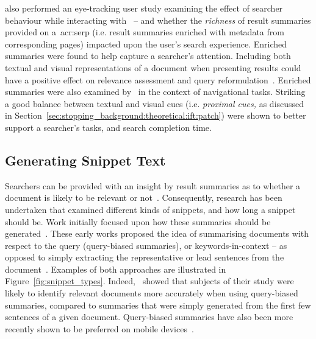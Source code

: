\cite{marcos2015snippets_web_search} also performed an eye-tracking user study examining the effect of searcher behaviour while interacting with~ -- and whether the \emph{richness} of result summaries provided on a~\gls{acr:serp} (i.e. result summaries enriched with metadata from corresponding pages) impacted upon the user's search experience. Enriched summaries were found to help capture a searcher's attention. Including both textual and visual representations of a document when presenting results could have a positive effect on relevance assessment and query reformulation~\citep{joho2006presentation}. Enriched summaries were also examined by~\cite{ali2009interaction_interfaces} in the context of navigational tasks. Striking a good balance between textual and visual cues (i.e. \emph{proximal cues,} as discussed in Section~\ref{sec:stopping_background:theoretical:ift:patch}) were shown to better support a searcher's tasks, and search completion time.

\subsection{Generating Snippet Text}\label{chap:snippets:background:generating}
Searchers can be provided with an insight by result summaries as to whether a document is likely to be relevant or not~\citep{he2012bridging}. Consequently, research has been undertaken that examined different kinds of snippets, and how long a snippet should be. Work initially focused upon how these summaries should be generated~\citep{pedersen1991snippet, landauer1993enhancing, tombros1998query_biased, white2003task, leal2015query}. These early works proposed the idea of summarising documents with respect to the query (query-biased summaries), or keywords-in-context -- as opposed to simply extracting the representative or lead sentences from the document~\citep{kupiec1995tds}. Examples of both approaches are illustrated in Figure~\ref{fig:snippet_types}. Indeed,~\cite{tombros1998query_biased} showed that subjects of their study were likely to identify relevant documents more accurately when using query-biased summaries, compared to summaries that were simply generated from the first few sentences of a given document. Query-biased summaries have also been more recently shown to be preferred on mobile devices~\citep{spirin2016snippets}.

